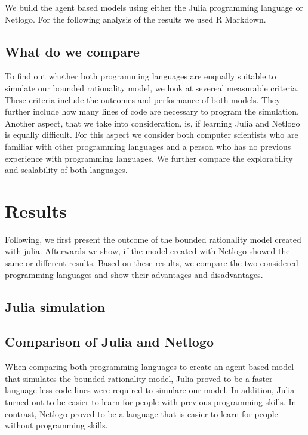 \documentclass[runningheads]{llncs}
\begin{document}
We build the agent based models using either the Julia programming
language or Netlogo. For the following analysis of the results we used R
Markdown.

\hypertarget{what-do-we-compare}{%
\subsection{What do we compare}\label{what-do-we-compare}}

To find out whether both programming languages are euqually suitable to
simulate our bounded rationality model, we look at severeal measurable
criteria. These criteria include the outcomes and performance of both
models. They further include how many lines of code are necessary to
program the simulation. Another aspect, that we take into consideration,
is, if learning Julia and Netlogo is equally difficult. For this aspect
we consider both computer scientists who are familiar with other
programming languages and a person who has no previous experience with
programming languages. We further compare the explorability and
scalability of both languages.

\hypertarget{results}{%
\section{Results}\label{results}}

Following, we first present the outcome of the bounded rationality model
created with julia. Afterwards we show, if the model created with
Netlogo showed the same or different results. Based on these results, we
compare the two considered programming languages and show their
advantages and disadvantages.

\hypertarget{julia-simulation}{%
\subsection{Julia simulation}\label{julia-simulation}}

\hypertarget{comparison-of-julia-and-netlogo}{%
\subsection{Comparison of Julia and
Netlogo}\label{comparison-of-julia-and-netlogo}}

When comparing both programming languages to create an agent-based model
that simulates the bounded rationality model, Julia proved to be a
faster language less code lines were required to simulare our model. In
addition, Julia turned out to be easier to learn for people with
previous programming skills. In contrast, Netlogo proved to be a
language that is easier to learn for people without programming skills.
\end{document}

